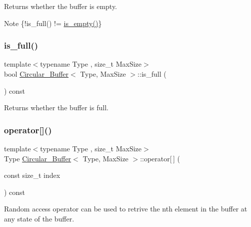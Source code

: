 Returns whether the buffer is empty. 

\begin{DoxyNote}{Note}
\{!is\+\_\+full() != \hyperlink{classCircular__Buffer_af2251f79c1509b7c1af0354ff7ac11fb}{is\+\_\+empty()}\} 
\end{DoxyNote}
\mbox{\label{classCircular__Buffer_a5d5ae2d1423cb1e5fc8e4e05d356cdca}} 
\subsubsection{\texorpdfstring{is\+\_\+full()}{is\_full()}}
{\footnotesize\ttfamily template$<$typename Type , size\+\_\+t Max\+Size$>$ \\
bool \hyperlink{classCircular__Buffer}{Circular\+\_\+\+Buffer}$<$ Type, Max\+Size $>$\+::is\+\_\+full (\begin{DoxyParamCaption}{ }\end{DoxyParamCaption}) const\hspace{0.3cm}{\ttfamily [inline]}}



Returns whether the buffer is full. 

\mbox{\label{classCircular__Buffer_a520f88f6e08b618a3b2923f157db541d}} 
\subsubsection{\texorpdfstring{operator[]()}{operator[]()}}
{\footnotesize\ttfamily template$<$typename Type , size\+\_\+t Max\+Size$>$ \\
Type \hyperlink{classCircular__Buffer}{Circular\+\_\+\+Buffer}$<$ Type, Max\+Size $>$\+::operator\mbox{[}$\,$\mbox{]} (\begin{DoxyParamCaption}\item[{const size\+\_\+t}]{index }\end{DoxyParamCaption}) const\hspace{0.3cm}{\ttfamily [inline]}}



Random access operator can be used to retrive the nth element in the buffer at any state of the buffer. 

